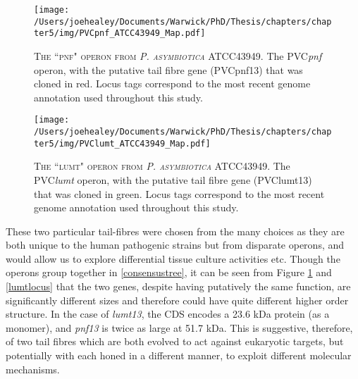 \vspace{0.1cm}
\begin{figure}[h]
	\centering
	\texttt{[image: /Users/joehealey/Documents/Warwick/PhD/Thesis/chapters/chapter5/img/PVCpnf\_ATCC43949\_Map.pdf]}
	\captionsetup{singlelinecheck=off, justification=justified, font=footnotesize, aboveskip=5pt}
	\caption[PVCpnf operon map identifying cloned PVCpnf13 protein]{\textsc{\normalsize The ``pnf" operon from \emph{P. asymbiotica} ATCC43949.}\vspace{0.1cm} \newline The PVC\emph{pnf} operon, with the putative tail fibre gene (PVCpnf13) that was cloned in red. Locus tags correspond to the most recent genome annotation used throughout this study.}
	\label{pnflocus}
\end{figure}
\vspace{-0.7cm}
\begin{figure}[h]
	\centering
	\texttt{[image: /Users/joehealey/Documents/Warwick/PhD/Thesis/chapters/chapter5/img/PVClumt\_ATCC43949\_Map.pdf]}
	\captionsetup{singlelinecheck=off, justification=justified, font=footnotesize, aboveskip=10pt}
	\caption[PVClumt operon map identifying cloned PVClumt13 protein]{\textsc{\normalsize The ``lumt" operon from \emph{P. asymbiotica} ATCC43949.}\vspace{0.1cm} \newline The PVC\emph{lumt} operon, with the putative tail fibre gene (PVClumt13) that was cloned in green. Locus tags correspond to the most recent genome annotation used throughout this study.}
	\label{lumtlocus}
\end{figure}

These two particular tail-fibres were chosen from the many choices as they are both unique to the human pathogenic strains but from disparate operons, and would allow us to explore differential tissue culture activities etc. Though the operons group together in \vref{consensustree}, it can be seen from Figure \ref{pnflocus} and \vref{lumtlocus} that the two genes, despite having putatively the same function, are significantly different sizes and therefore could have quite different higher order structure. In the case of \emph{lumt13}, the CDS encodes a 23.6 kDa protein (as a monomer), and \emph{pnf13} is twice as large at 51.7 kDa. This is suggestive, therefore, of two tail fibres which are both evolved to act against eukaryotic targets, but potentially with each honed in a different manner, to exploit different molecular mechanisms.


